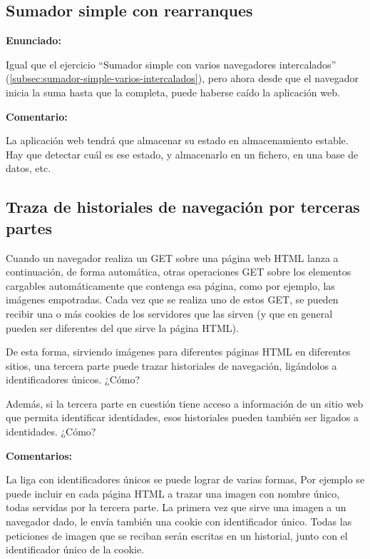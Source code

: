 \subsection{Sumador simple con rearranques}
\label{subsec:sumador-simple-rearranques}

\textbf{Enunciado:}

Igual que el ejercicio ``Sumador simple con varios navegadores intercalados'' (\ref{subsec:sumador-simple-varios-intercalados}), pero ahora desde que el navegador inicia la suma hasta que la completa, puede haberse caído la aplicación web.

\textbf{Comentario:}

La aplicación web tendrá que  almacenar su estado en almacenamiento estable. Hay que detectar cuál es ese estado, y almacenarlo en  un fichero, en  una base de datos, etc.

\subsection{Traza de historiales de navegación por terceras partes}
\label{subsec:navegacion-terceras-partes}

Cuando un navegador realiza un GET sobre una página web HTML lanza a continuación, de forma automática, otras operaciones GET sobre los elementos cargables automáticamente que contenga esa página, como por ejemplo, las imágenes empotradas. Cada vez que se realiza uno de estos GET, se pueden recibir una o más cookies de los servidores que las sirven (y que en general pueden ser diferentes del que sirve la página HTML).

De esta forma, sirviendo imágenes para diferentes páginas HTML en diferentes sitios, una tercera parte puede trazar historiales de navegación, ligándolos a identificadores únicos. ¿Cómo?

Además, si la tercera parte en cuestión tiene acceso a información de un sitio web que permita identificar identidades, esos historiales pueden también ser ligados a identidades. ¿Cómo?

\textbf{Comentarios:}

La liga con identificadores únicos se puede lograr de varias formas, Por ejemplo se puede incluir en cada página HTML a trazar una imagen con nombre único, todas servidas por la tercera parte. La primera vez que sirve una imagen a un navegador dado, le envía también una cookie con identificador único. Todas las peticiones de imagen que se reciban serán escritas en un historial, junto con el identificador único de la cookie.

